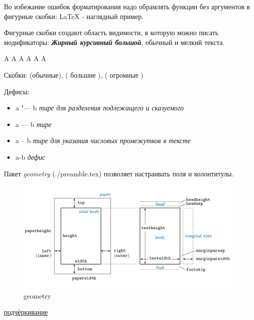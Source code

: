 Во избежание ошибок форматирования надо обрамлять функции без аргументов в
фигурные скобки: {\LaTeX} - наглядный пример.

Фигурные скобки создают область видимости, в которую можно писать модификаторы:
{\bfseries \itshape \Large Жирный курсивный большой}, обычный и {\small
мелкий} текста.

\Huge A
\LARGE A
\Large A
\large A
\normalsize A
\small A

Скобки: (обычные), \big( большие \big), \bigg( огромные \bigg)

Дефисы:
\begin{itemize}
  \item a "--- b \textit{тире для разделения подлежащего и сказуемого}
  \item a --- b \textit{тире}
  \item a -- b \textit{тире для указания числовых промежутков в тексте}
  \item a-b \textit{дефис}
\end{itemize}


Пакет \textit{geometry} (./preamble.tex) позволяет настраивать поля и
колонтитулы.
\begin{figure}[h!]
  \centering
  \includegraphics[width=1\textwidth]{./images/geometry.png}
  \caption{geometry}
  \label{figure:geometry}
\end{figure}



\ul{подчёркивание}

